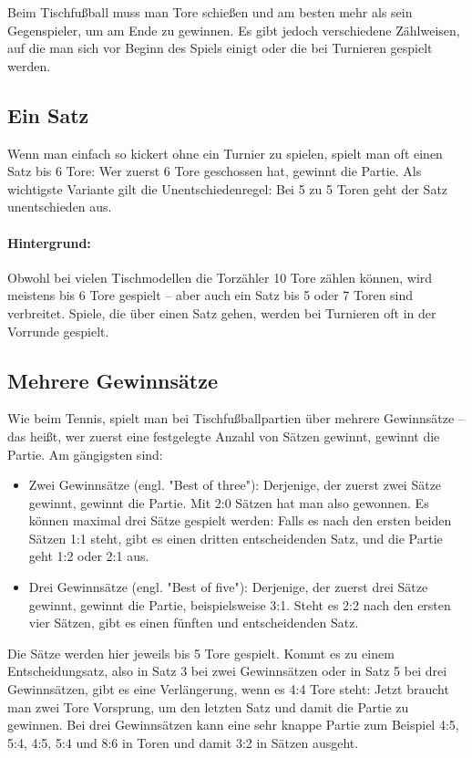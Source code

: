 Beim Tischfußball muss man Tore schießen und am besten mehr als sein Gegenspieler, um am Ende zu gewinnen.
Es gibt jedoch verschiedene Zählweisen, auf die man sich vor Beginn des Spiels einigt oder die bei Turnieren gespielt werden. 

\subsection{Ein Satz}
\label{spielformen:zaehlweisen:einsatz}

Wenn man einfach so kickert ohne ein Turnier zu spielen, spielt man oft einen Satz bis 6 Tore: Wer zuerst 6 Tore geschossen hat, gewinnt die Partie.
Als wichtigste Variante gilt die Unentschiedenregel: Bei 5 zu 5 Toren geht der Satz unentschieden aus.

\paragraph{Hintergrund:}
Obwohl bei vielen Tischmodellen die Torzähler 10 Tore zählen können, wird meistens bis 6 Tore gespielt -- aber auch ein Satz bis 5 oder 7 Toren sind verbreitet.
Spiele, die über einen Satz gehen, werden bei Turnieren oft in der Vorrunde gespielt.


\subsection{Mehrere Gewinnsätze}
\label{spielformen:zaehlweisen:gewinnsaetze}

Wie beim Tennis, spielt man bei Tischfußballpartien über mehrere Gewinnsätze -- das heißt, wer zuerst eine festgelegte Anzahl von Sätzen gewinnt, gewinnt die Partie. Am gängigsten sind:
\begin{itemize}
\item Zwei Gewinnsätze (engl. "Best of three"): Derjenige, der zuerst zwei Sätze gewinnt, gewinnt die Partie. Mit 2:0 Sätzen hat man also gewonnen. 
Es können maximal drei Sätze gespielt werden: Falls es nach den ersten beiden Sätzen 1:1 steht, gibt es einen dritten entscheidenden Satz, und die Partie geht 1:2 oder 2:1 aus. 
\item Drei Gewinnsätze (engl. "Best of five"): Derjenige, der zuerst drei Sätze gewinnt, gewinnt die Partie, beispielsweise 3:1. Steht es 2:2 nach den ersten vier Sätzen, gibt es einen fünften und entscheidenden Satz. 
\end{itemize}
Die Sätze werden hier jeweils bis 5 Tore gespielt. Kommt es zu einem Entscheidungsatz, also in Satz 3 bei zwei Gewinnsätzen oder in Satz 5 bei drei Gewinnsätzen, gibt es eine Verlängerung, wenn es 4:4 Tore steht: Jetzt braucht man zwei Tore Vorsprung, um den letzten Satz und damit die Partie zu gewinnen. Bei drei Gewinnsätzen kann eine sehr knappe Partie zum Beispiel 4:5, 5:4, 4:5, 5:4 und 8:6 in Toren und damit 3:2 in Sätzen ausgeht. 

